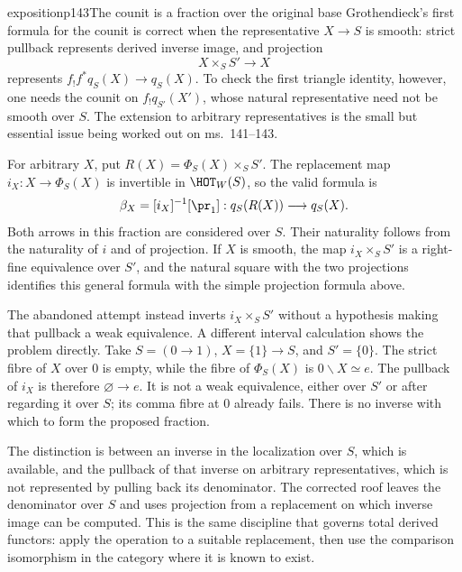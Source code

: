 \begin{dcomment}{exposition}{p143}{The counit is a fraction over the original base}
Grothendieck's first formula for the counit is correct when the representative $X\to S$ is smooth: strict pullback represents derived inverse image, and projection
\[
 X\times_S S'\longrightarrow X
\]
represents $f_!f^*q_S(X)\to q_S(X)$. To check the first triangle identity, however, one needs the counit on $f_!q_{S'}(X')$, whose natural representative need not be smooth over $S$. The extension to arbitrary representatives is the small but essential issue being worked out on ms.~141--143.

For arbitrary $X$, put $R(X)=\Phi_S(X)\times_S S'$. The replacement map $i_X:X\to\Phi_S(X)$ is invertible in $\HOT_W(S)$, so the valid formula is
\[
 \beta_X=[i_X]^{-1}[\pr_1]:q_S(R(X))\longrightarrow q_S(X).
\]
Both arrows in this fraction are considered over $S$. Their naturality follows from the naturality of $i$ and of projection. If $X$ is smooth, the map $i_X\times_S S'$ is a right-fine equivalence over $S'$, and the natural square with the two projections identifies this general formula with the simple projection formula above.

The abandoned attempt instead inverts $i_X\times_S S'$ without a hypothesis making that pullback a weak equivalence. A different interval calculation shows the problem directly. Take $S=(0\to1)$, $X=\{1\}\to S$, and $S'=\{0\}$. The strict fibre of $X$ over $0$ is empty, while the fibre of $\Phi_S(X)$ is $0\backslash X\simeq e$. The pullback of $i_X$ is therefore $\varnothing\to e$. It is not a weak equivalence, either over $S'$ or after regarding it over $S$; its comma fibre at $0$ already fails. There is no inverse with which to form the proposed fraction.

The distinction is between an inverse in the localization over $S$, which is available, and the pullback of that inverse on arbitrary representatives, which is not represented by pulling back its denominator. The corrected roof leaves the denominator over $S$ and uses projection from a replacement on which inverse image can be computed. This is the same discipline that governs total derived functors: apply the operation to a suitable replacement, then use the comparison isomorphism in the category where it is known to exist.
\end{dcomment}

